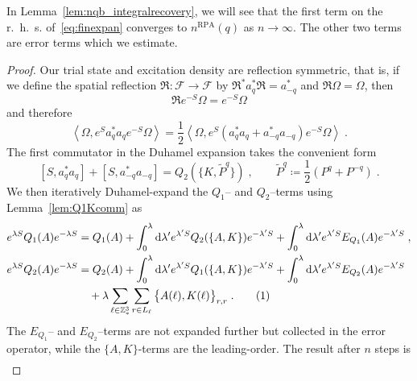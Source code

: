 \documentclass[12pt,a4paper]{article}
\numberwithin{equation}{section}
\newcommand{\cF}{\mathcal{F}}
\newcommand{\fR}{\mathfrak{R}}
\newcommand{\1}{\mathbb{I}}
\newcommand{\di}{\textnormal{d}}
\newcommand{\RPA}{\mathrm{RPA}}
\newcommand{\tagg}[1]{ \stepcounter{equation} \tag{\theequation}
\label{#1} } %
\newcommand{\Z}{\mathbb{Z}}
\newcommand{\half}{\frac{1}{2}}
\newcommand{\eva}[1]{\left\langle #1 \right\rangle}
\theoremstyle{plain}
\theoremstyle{definition}
\theoremstyle{remark}
\theoremstyle{plain}
\theoremstyle{definition}
\theoremstyle{remark}
\begin{document}
In Lemma~\ref{lem:nqb_integralrecovery}, we will see that the first term on the r.~h.~s. of~\eqref{eq:finexpan} converges to $ n^{\RPA}(q) $ as $ n \to \infty $.  The other two terms are error terms which we estimate.


\begin{proof}
Our trial state and excitation density are reflection symmetric, that is, if we define the spatial reflection $ \fR: \cF \to \cF $ by $ \fR^* a_q^* \fR = a^*_{-q} $ and $ \fR \Omega = \Omega $, then
\begin{equation} \label{eq:reflectionsymmetry}
	\fR e^{-S} \Omega = e^{-S} \Omega
\end{equation}
and therefore
\begin{equation}
	\eva{\Omega, e^{S} a_q^* a_q e^{-S} \Omega} = \half \eva{\Omega, e^{S} (a_q^* a_q + a_{-q}^* a_{-q}) e^{-S} \Omega} \;.
\end{equation}
The first commutator in the Duhamel expansion takes the convenient form
\begin{equation} \label{eq:firstcommutator}
	[S, a_q^* a_q] + [S, a_{-q}^* a_{-q}]
	= Q_2(\{K,\tilde{P}^q\}) \;, \qquad
	\tilde{P}^q \coloneq \half(P^q + P^{-q}) \;.
\end{equation}
We then iteratively Duhamel-expand the $ Q_1$-- and $ Q_2 $--terms using Lemma~\ref{lem:Q1Kcomm} as 
\begin{align*}
	e^{\lambda S} Q_1(A) e^{-\lambda S}
	&= Q_1(A) + \int_0^{\lambda} \di \lambda' e^{\lambda' S} Q_2(\{A,K\}) e^{-\lambda' S}
		+ \int_0^{\lambda} \di \lambda' e^{\lambda' S} E_{Q_1}(A) e^{-\lambda' S} \;, \\
	e^{\lambda S} Q_2(A) e^{-\lambda S}
	&= Q_2(A) + \int_0^{\lambda} \di \lambda' e^{\lambda' S} Q_1(\{A,K\}) e^{-\lambda' S}
		+ \int_0^{\lambda} \di \lambda' e^{\lambda' S} E_{Q_2}(A) e^{-\lambda' S} \\
	&\quad + \lambda \sum_{\ell \in \Z^3_*} \sum_{r \in L_{\ell}} \big\{ A(\ell), K(\ell) \big\}_{r,r} \;. \tagg{eq:expand}
\end{align*}
The $ E_{Q_1}$-- and $ E_{Q_2} $--terms are not expanded further but collected in the error operator, while the $ \{A,K\} $-terms are the leading-order. The result after $ n $ steps is
\begin{align}

\end{align}
\end{proof}
\end{document}

